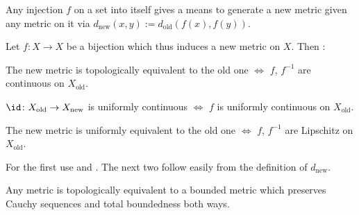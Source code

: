 	\begin{dgrs}
		Any injection $f$ on a set into itself gives a means to generate a new metric given any metric on it via $d_\text{new}(x, y) := d_\text{old}(f(x), f(y))$.
		
		\begin{lem}\label{LEM: to show counters for equiv of metrics}
			Let $f\colon X\to X$ be a bijection which thus induces a new metric on $X$. Then \tfh:
			\begin{mylist}
				\item The new metric is topologically equivalent to the old one $\iff$ $f$, $f^{-1}$ are continuous on $X_\text{old}$.
				
				\item $\id\colon X_\text{old}\to X_\text{new}$ is uniformly continuous $\iff$ $f$ is uniformly continuous on $X_\text{old}$.
				
				\item The new metric is uniformly equivalent to the old one $\iff$ $f$, $f^{-1}$ are Lipschitz on $X_\text{old}$.
			\end{mylist}
		\end{lem}
		
		\begin{dgrsProof}
			For the first use  and . The next two follow easily from the definition of $d_\text{new}$.
		\end{dgrsProof}
	\end{dgrs}
	
	
	\begin{prp}\label{PRP: any metric is topologically equiv to a bdd metric}
		Any metric is topologically equivalent to a bounded metric which preserves Cauchy sequences and total boundedness both ways.
	\end{prp}
	
